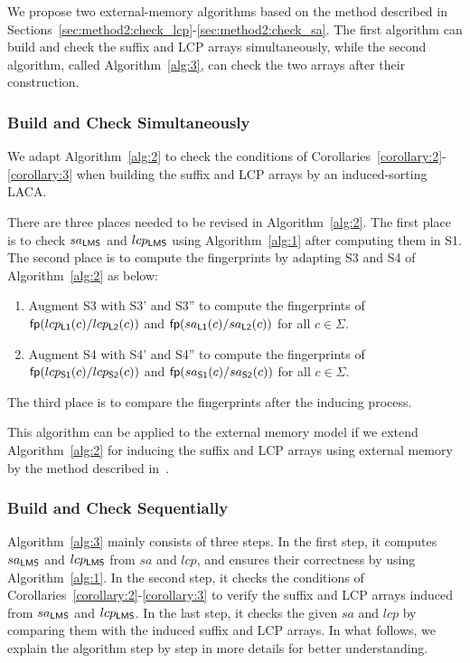\documentclass[10pt,journal,compsoc]{IEEEtran}
\begin{document}
	We propose two external-memory algorithms based on the method described in Sections~\ref{sec:method2:check_lcp}-\ref{sec:method2:check_sa}. The first algorithm can build and check the suffix and LCP arrays simultaneously, while the second algorithm, called Algorithm~\ref{alg:3}, can check the two arrays after their construction.
	
	\subsubsection{Build and Check Simultaneously} \label{sec:method2:algorithm:sim}
	
	We adapt Algorithm~\ref{alg:2} to check the conditions of Corollaries~\ref{corollary:2}-\ref{corollary:3} when building the suffix and LCP arrays by an induced-sorting LACA.

	There are three places needed to be revised in Algorithm~\ref{alg:2}. The first place is to check $sa_{\sf LMS}$ and $lcp_{\sf LMS}$ using Algorithm~\ref{alg:1} after computing them in S1. The second place is to compute the fingerprints by adapting S3 and S4 of Algorithm~\ref{alg:2} as below:
	
	\begin{enumerate} [(1)]
		
		\item
		Augment S3 with S3' and S3'' to compute the fingerprints of ${\sf fp}(lcp_{\sf L1}(c)/lcp_{\sf L2}(c))$ and ${\sf fp}(sa_{\sf L1}(c)/sa_{\sf L2}(c))$ for all $c \in \Sigma$.
		
		\item
		Augment S4 with S4' and S4'' to compute the fingerprints of ${\sf fp}(lcp_{\sf S1}(c)/lcp_{\sf S2}(c))$ and ${\sf fp}(sa_{\sf S1}(c)/sa_{\sf S2}(c))$ for all $c \in \Sigma$.
		
	\end{enumerate}
	
	The third place is to compare the fingerprints after the inducing process.
	
	This algorithm can be applied to the external memory model if we extend Algorithm~\ref{alg:2} for inducing the suffix and LCP arrays using external memory by the method described in~\cite{Bingmann12}.
	
	\subsubsection{Build and Check Sequentially}
	
		Algorithm~\ref{alg:3} mainly consists of three steps. In the first step, it computes $sa_{\sf LMS}$ and $lcp_{\sf LMS}$ from $sa$ and $lcp$, and ensures their correctness by using Algorithm~\ref{alg:1}. In the second step, it checks the conditions of Corollaries~\ref{corollary:2}-\ref{corollary:3} to verify the suffix and LCP arrays induced from $sa_{\sf LMS}$ and $lcp_{\sf LMS}$. In the last step, it checks the given $sa$ and $lcp$ by comparing them with the induced suffix and LCP arrays. In what follows, we explain the algorithm step by step in more details for better understanding.
	
\end{document}
